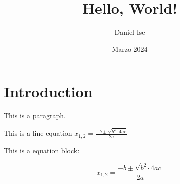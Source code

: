 \documentclass{article}
\title{Hello, World!}
\author{Daniel Ise}
\date{Marzo 2024}
\begin{document}
\maketitle
\section{Introduction}

This is a paragraph. 

This is a line equation $x_{1,2}=\frac{-b \pm \sqrt{b^{2} \cdot 4ac}}{2a}$

This is a equation block:

\begin{equation}
	x_{1,2}=\frac{-b \pm \sqrt{b^{2} \cdot 4ac}}{2a}
	\label{eq: Resolvente}
\end{equation}
\end{document}
